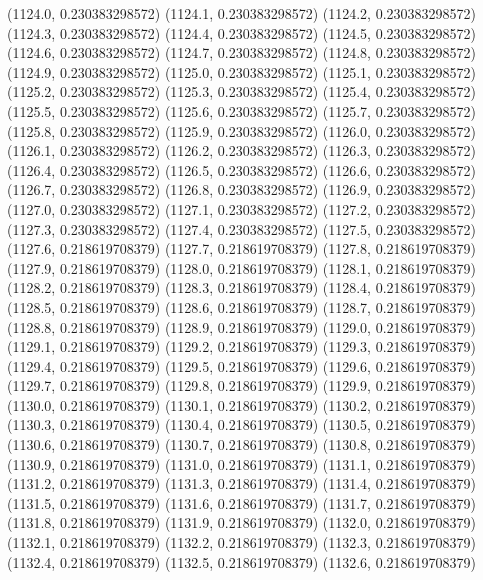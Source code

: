 {					(1124.0, 0.230383298572)
					(1124.1, 0.230383298572)
					(1124.2, 0.230383298572)
					(1124.3, 0.230383298572)
					(1124.4, 0.230383298572)
					(1124.5, 0.230383298572)
					(1124.6, 0.230383298572)
					(1124.7, 0.230383298572)
					(1124.8, 0.230383298572)
					(1124.9, 0.230383298572)
					(1125.0, 0.230383298572)
					(1125.1, 0.230383298572)
					(1125.2, 0.230383298572)
					(1125.3, 0.230383298572)
					(1125.4, 0.230383298572)
					(1125.5, 0.230383298572)
					(1125.6, 0.230383298572)
					(1125.7, 0.230383298572)
					(1125.8, 0.230383298572)
					(1125.9, 0.230383298572)
					(1126.0, 0.230383298572)
					(1126.1, 0.230383298572)
					(1126.2, 0.230383298572)
					(1126.3, 0.230383298572)
					(1126.4, 0.230383298572)
					(1126.5, 0.230383298572)
					(1126.6, 0.230383298572)
					(1126.7, 0.230383298572)
					(1126.8, 0.230383298572)
					(1126.9, 0.230383298572)
					(1127.0, 0.230383298572)
					(1127.1, 0.230383298572)
					(1127.2, 0.230383298572)
					(1127.3, 0.230383298572)
					(1127.4, 0.230383298572)
					(1127.5, 0.230383298572)
					(1127.6, 0.218619708379)
					(1127.7, 0.218619708379)
					(1127.8, 0.218619708379)
					(1127.9, 0.218619708379)
					(1128.0, 0.218619708379)
					(1128.1, 0.218619708379)
					(1128.2, 0.218619708379)
					(1128.3, 0.218619708379)
					(1128.4, 0.218619708379)
					(1128.5, 0.218619708379)
					(1128.6, 0.218619708379)
					(1128.7, 0.218619708379)
					(1128.8, 0.218619708379)
					(1128.9, 0.218619708379)
					(1129.0, 0.218619708379)
					(1129.1, 0.218619708379)
					(1129.2, 0.218619708379)
					(1129.3, 0.218619708379)
					(1129.4, 0.218619708379)
					(1129.5, 0.218619708379)
					(1129.6, 0.218619708379)
					(1129.7, 0.218619708379)
					(1129.8, 0.218619708379)
					(1129.9, 0.218619708379)
					(1130.0, 0.218619708379)
					(1130.1, 0.218619708379)
					(1130.2, 0.218619708379)
					(1130.3, 0.218619708379)
					(1130.4, 0.218619708379)
					(1130.5, 0.218619708379)
					(1130.6, 0.218619708379)
					(1130.7, 0.218619708379)
					(1130.8, 0.218619708379)
					(1130.9, 0.218619708379)
					(1131.0, 0.218619708379)
					(1131.1, 0.218619708379)
					(1131.2, 0.218619708379)
					(1131.3, 0.218619708379)
					(1131.4, 0.218619708379)
					(1131.5, 0.218619708379)
					(1131.6, 0.218619708379)
					(1131.7, 0.218619708379)
					(1131.8, 0.218619708379)
					(1131.9, 0.218619708379)
					(1132.0, 0.218619708379)
					(1132.1, 0.218619708379)
					(1132.2, 0.218619708379)
					(1132.3, 0.218619708379)
					(1132.4, 0.218619708379)
					(1132.5, 0.218619708379)
					(1132.6, 0.218619708379)
}
